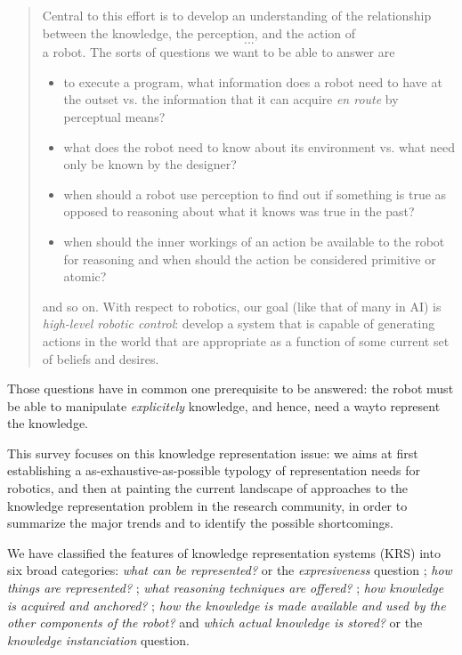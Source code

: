 \documentclass[a4paper, twocolumn]{article}
\begin{document}
\begin{quotation}

    Central to this effort is to develop an understanding of the relationship
    between the knowledge, the perception, and the action of \[...\] a robot. The
    sorts of questions we want to be able to answer are

    \begin{itemize} 

        \item to execute a program, what information does a robot need to have
        at the outset vs. the information that it can acquire \emph{en route}
        by perceptual means?

        \item what does the robot need to know about its environment vs. what
        need only be known by the designer?

        \item when should a robot use perception to find out if something is
        true as opposed to reasoning about what it knows was true in the past?

        \item when should the inner workings of an action be available to the
        robot for reasoning and when should the action be considered primitive
        or atomic?

    \end{itemize}

    and so on. With respect to robotics, our goal (like that of many in AI) is
    \emph{high-level robotic control}: develop a system that is capable of
    generating actions in the world that are appropriate as a function of some
    current set of beliefs and desires.

\end{quotation}

Those questions have in common one prerequisite to be answered: the robot must
be able to manipulate \emph{explicitely} knowledge, and hence, need a wayto
represent the knowledge.

This survey focuses on this knowledge representation issue: we aims at first
establishing a as-exhaustive-as-possible typology of representation needs for
robotics, and then at painting the current landscape of approaches to the
knowledge representation problem in the research community, in order to
summarize the major trends and to identify the possible shortcomings.

We have classified the features of knowledge representation systems (KRS) into
six broad categories: \emph{what can be represented?} or the
\emph{expresiveness} question ; \emph{how things are represented?} ; \emph{what
reasoning techniques are offered?} ; \emph{how knowledge is acquired and
anchored?} ; \emph{how the knowledge is made available and used by the other
components of the robot?} and \emph{which actual knowledge is stored?} or the
\emph{knowledge instanciation} question.
\end{document}

